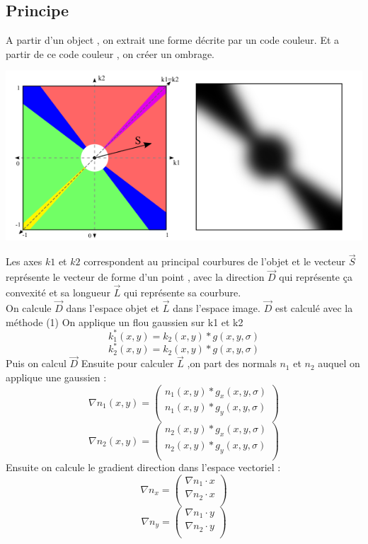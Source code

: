 \documentclass[a4paper]{article}
\begin{document}
\subsection{Principe}
A partir d'un object , on extrait une forme décrite par un code couleur.
Et a partir de ce code couleur , on créer un ombrage. 

\begin{center}
\includegraphics[scale=0.5]{Shape_descriptor.png}
\end{center}

Les axes $k1$ et $k2$ correspondent au principal courbures de l'objet et le vecteur $\vec{S}$ représente le vecteur de forme d'un point , avec la direction $\vec{D}$ qui représente ça convexité et sa longueur $\vec{L}$ qui représente sa courbure.\\
On calcule $\vec{D}$ dans l'espace objet et $\vec{L}$ dans l'espace image. 
$\vec{D}$ est calculé avec la méthode (1)
On applique un flou gaussien sur k1 et k2 
\[k_1^*(x,y) = k_2(x,y) \ast  g(x,y,\sigma)\]
\[k_2^*(x,y) = k_2(x,y) \ast  g(x,y,\sigma)\]
Puis on calcul $\vec{D}$ 
Ensuite pour calculer $\vec{L}$ ,on part des normals $n_1$ et $n_2$ auquel on applique une gaussien : 
\[\nabla n_1 (x,y) = 
\begin{pmatrix}
n_1(x,y) \ast  g_x(x,y,\sigma) \\
n_1(x,y) \ast  g_y(x,y,\sigma) \\
\end{pmatrix}\] 
\[\nabla n_2 (x,y) = 
\begin{pmatrix}
n_2(x,y) \ast  g_x(x,y,\sigma) \\
n_2(x,y) \ast  g_y(x,y,\sigma) \\
\end{pmatrix} 
\]
Ensuite on calcule le gradient direction dans l'espace vectoriel : 
\[\nabla n_x = 
\begin{pmatrix}
\nabla n_1 \cdot{x} \\
\nabla n_2 \cdot{x} \\
\end{pmatrix}\] 
\[\nabla n_y = 
\begin{pmatrix}
\nabla n_1 \cdot{y} \\
\nabla n_2 \cdot{y} \\
\end{pmatrix}\] 
\end{document}
